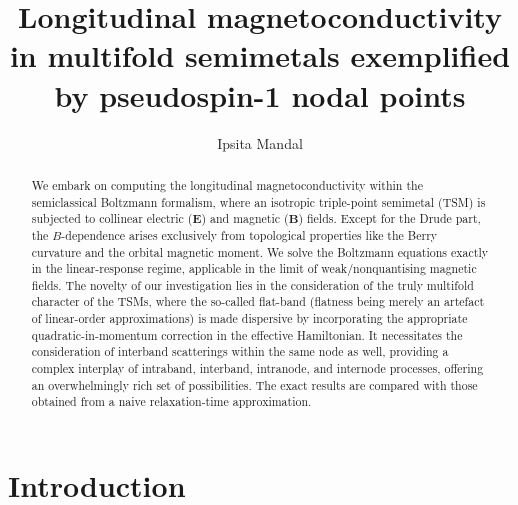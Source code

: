\documentclass[aps,prb,onecolumn,nofootinbib,citeautoscript,10pt]{revtex4-2}
\begin{document}
\title{Longitudinal magnetoconductivity in multifold semimetals exemplified by pseudospin-1 nodal points}



\author{Ipsita Mandal}


 
\begin{abstract} 
We embark on computing the longitudinal magnetoconductivity within the semiclassical Boltzmann formalism, where an isotropic triple-point semimetal (TSM) is subjected to collinear electric ($\boldsymbol E $) and magnetic ($\boldsymbol B$) fields. Except for the Drude part, the $B$-dependence arises exclusively from topological properties like the Berry curvature and the orbital magnetic moment. We solve the Boltzmann equations exactly in the linear-response regime, applicable in the limit of weak/nonquantising magnetic fields. The novelty of our investigation lies in the consideration of the truly multifold character of the TSMs, where the so-called flat-band (flatness being merely an artefact of linear-order approximations) is made dispersive by incorporating the appropriate quadratic-in-momentum correction in the effective Hamiltonian. It necessitates the consideration of interband scatterings within the same node as well, providing a complex interplay of intraband, interband, intranode, and internode processes, offering an overwhelmingly rich set of possibilities. The exact results are compared with those obtained from a naive relaxation-time approximation.
\end{abstract}


\maketitle
\tableofcontents



\section{Introduction}
\end{document}
